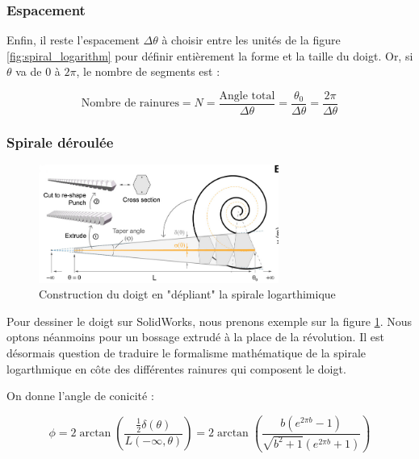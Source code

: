 \documentclass[a4paper, 11pt]{report}
\begin{document}
        \subsubsection{Espacement}
            
            Enfin, il reste l'espacement $\Delta\theta$ à choisir entre les unités de la figure \ref{fig:spiral_logarithm} pour définir entièrement la forme et la taille du doigt. \cite{wang_spirobs_2025} Or, si $\theta$ va de $0$ à $2\pi$, le nombre de segments est :
        
            \begin{equation}
            \text{Nombre de rainures} = N = \frac{\text{Angle total}}{\Delta\theta}
            = \frac{\theta_0}{\Delta \theta}
            = \frac{2\pi}{\Delta\theta}
            \label{eq:nb_segment}
            \end{equation}

        \subsubsection{Spirale déroulée}

            \begin{figure}
                \centering
                \includegraphics[width=0.7\textwidth]{Figures/draw_solidworks.png}
                \caption{Construction du doigt en "dépliant" la spirale logarthimique \cite{wang_spirobs_2025}}
                \label{fig:draw_solidworks}
            \end{figure}

            Pour dessiner le doigt sur SolidWorks, nous prenons exemple sur la figure \ref{fig:draw_solidworks}. Nous optons néanmoins pour un bossage extrudé à la place de la révolution. Il est désormais question de traduire le formalisme mathématique de la spirale logarthmique en côte des différentes rainures qui composent le doigt.

            On donne l'angle de conicité :

            \begin{equation}
            \phi = 2\arctan \left(
                \frac{\frac{1}{2}\delta(\theta)}{L(-\infty, \theta)}
                \right) = 2 \arctan\left(\frac{b(e^{2\pi b}-1)}{\sqrt{b^2+1} \left(e^{2\pi b}+1\right)}\right)
            \label{eq:angle_de_conicite}
            \end{equation}
\end{document}
